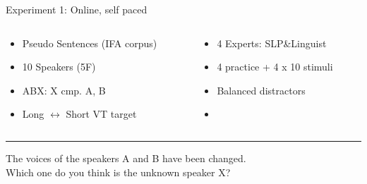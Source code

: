 \documentclass[xcolor={dvipsnames}]{beamer}
\begin{document}
\begin{frame}{Experiment 1: Online, self paced}
\begin{columns}
\begin{column}{0.48\textwidth}
\begin{itemize}
    \item Pseudo Sentences (IFA corpus)
    \item 10 Speakers (5F)
    \item ABX: X cmp. A, B
    \item[ ] Long $\leftrightarrow$ Short VT target
\end{itemize}
\end{column}
\begin{column}{0.48\textwidth}
\begin{itemize}
    \item 4 Experts: SLP\&Linguist
    \item 4 practice + 4 x 10 stimuli
    \item Balanced distractors
    \item[ ] \ 
\end{itemize}
\end{column}
\end{columns}
\vskip 1cm
\hrule
\vskip 0.5cm
The voices of the speakers A and B have been changed. \\
Which one do you think is the unknown speaker X?
\vskip 0.5cm


\end{frame}
\end{document}
